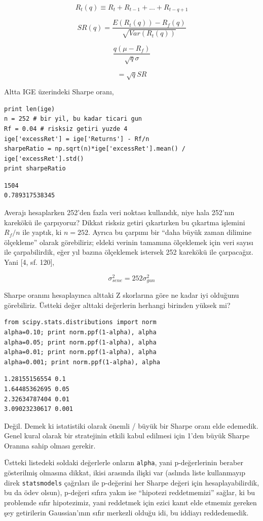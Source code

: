 \documentclass[12pt,fleqn]{article}\usepackage{../../common}
\begin{document}
$$ R_t(q) \equiv R_t + R_{t-1} + ... + R_{t-q+1}  $$

$$ SR(q) = \frac{E(R_t(q)) - R_f(q)}{\sqrt{Var(R_t(q))}} $$

$$ \frac{q(\mu-R_f)}{\sqrt{q} \sigma} $$

$$ = \sqrt{q}SR $$

Altta IGE üzerindeki Sharpe oranı,

\begin{verbatim}
print len(ige)
n = 252 # bir yil, bu kadar ticari gun
Rf = 0.04 # risksiz getiri yuzde 4
ige['excessRet'] = ige['Returns'] - Rf/n
sharpeRatio = np.sqrt(n)*ige['excessRet'].mean() / ige['excessRet'].std()
print sharpeRatio
\end{verbatim}

\begin{verbatim}
1504
0.789317538345
\end{verbatim}

Averajı hesaplarken 252'den fazla veri noktası kullandık, niye hala 252'nın
karekökü ile çarpıyoruz? Dikkat risksiz getiri çıkartırken bu çıkartma
işlemini $R_f/n$ ile yaptık, ki $n=252$. Ayrıca bu çarpımı bir ``daha büyük
zaman dilimine ölçekleme'' olarak görebiliriz; eldeki verinin tamamına
ölçeklemek için veri sayısı ile çarpabilirdik, eğer yıl bazına ölçeklemek
istersek 252 karekökü ile çarpacağız. Yani [4, sf. 120], 

$$ \sigma_{sene}^2 = 252 \sigma_{gun}^2 $$

Sharpe oranını hesaplayınca alttaki Z skorlarına göre ne kadar iyi olduğunu
görebiliriz. Üstteki değer alttaki değerlerin herhangi birinden yüksek mi?

\begin{verbatim}
from scipy.stats.distributions import norm
alpha=0.10; print norm.ppf(1-alpha), alpha
alpha=0.05; print norm.ppf(1-alpha), alpha
alpha=0.01; print norm.ppf(1-alpha), alpha
alpha=0.001; print norm.ppf(1-alpha), alpha
\end{verbatim}

\begin{verbatim}
1.28155156554 0.1
1.64485362695 0.05
2.32634787404 0.01
3.09023230617 0.001
\end{verbatim}

Değil. Demek ki istatistiki olarak önemli / büyük bir Sharpe oranı elde
edemedik. Genel kural olarak bir stratejinin etkili kabul edilmesi için
1'den büyük Sharpe Oranına sahip olması gerekir. 

Üstteki listedeki soldaki değerlerle onların \verb!alpha!, yani
p-değerlerinin beraber gösterilmiş olmasına dikkat, ikisi arasında ilişki
var (aslında liste kullanmayıp direk \verb!statsmodels! çağrıları ile
p-değerini her Sharpe değeri için hesaplayabilirdik, bu da ödev olsun),
p-değeri sıfıra yakın ise ``hipotezi reddetmemizi'' sağlar, ki bu problemde
sıfır hipotezimiz, yani reddetmek için ezici kanıt elde etmemiz gereken
şey getirilerin Gaussian'ının sıfır merkezli olduğu idi, bu iddiayı
reddedemedik.
\end{document}
